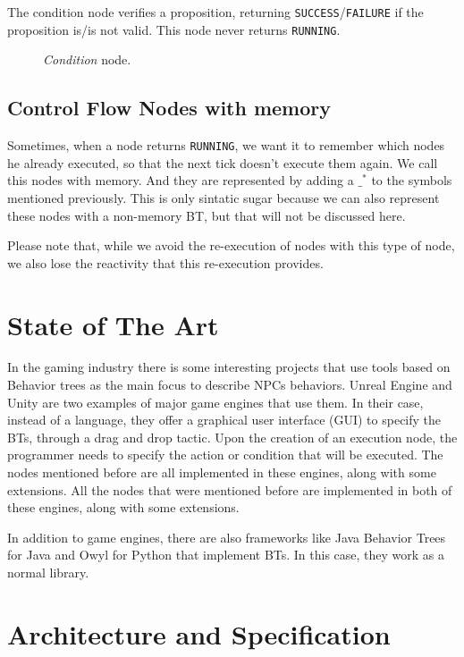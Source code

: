 \documentclass[a4paper,UKenglish,cleveref, autoref, thm-restate]{oasics-v2019}
\begin{document}
The condition node verifies a proposition, returning \texttt{SUCCESS}/\texttt{FAILURE} if the proposition is/is not valid.
This node never returns \texttt{RUNNING}.
\begin{figure}[H]
    \centering
    \begin{behavior}
    \end{behavior}
    \caption{\textit{Condition} node.}
    \label{fig:condition}
\end{figure}


\subsection{Control Flow Nodes with memory}
Sometimes, when a node returns \texttt{RUNNING}, we want it to remember which nodes he already executed, so that the next tick doesn't execute them again.
We call this nodes with memory.
And they are represented by adding a $\_^*$ to the symbols mentioned previously.
This is only sintatic sugar because we can also represent these nodes with a non-memory BT, but that will not be discussed here.

Please note that, while we avoid the re-execution of nodes with this type of node, we also lose the reactivity that this re-execution provides.

\section{State of The Art}
\label{sec:state-of-the-art}
In the gaming industry there is some interesting projects that use tools based on Behavior trees as the main focus to describe NPCs behaviors.
Unreal Engine and Unity are two examples of major game engines that use them.
In their case, instead of a language, they offer a graphical user interface (GUI) to specify the BTs, through a drag and drop tactic.
Upon the creation of an execution node, the programmer needs to specify the action or condition that will be executed.
The nodes mentioned before are all implemented in these engines, along with some extensions.
All the nodes that were mentioned before are implemented in both of these engines, along with some extensions.

In addition to game engines, there are also frameworks like Java Behavior Trees for Java and Owyl for Python that implement BTs.
In this case, they work as a normal library.

\section{Architecture and Specification}
\label{sec:arc-spec}
\end{document}
